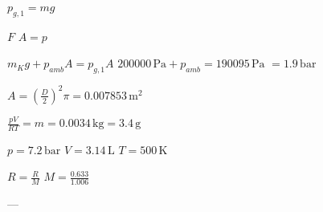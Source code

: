 \( p_{g,1} = mg \)  

\( F \)  
\( A = p \)  

\( m_{K} g + p_{amb} A = p_{g,1} A \)  
\( 200000 \, \text{Pa} + p_{amb} = 190095 \, \text{Pa} \)  
\( = 1.9 \, \text{bar} \)  

\( A = \left(\frac{D}{2}\right)^2 \pi = 0.007853 \, \text{m}^2 \)  

\( \frac{pV}{RT} = m = 0.0034 \, \text{kg} = 3.4 \, \text{g} \)  

\( p = 7.2 \, \text{bar} \)  
\( V = 3.14 \, \text{L} \)  
\( T = 500 \, \text{K} \)  

\( R = \frac{R}{M} \)  
\( M = \frac{0.633}{1.006} \)  

---